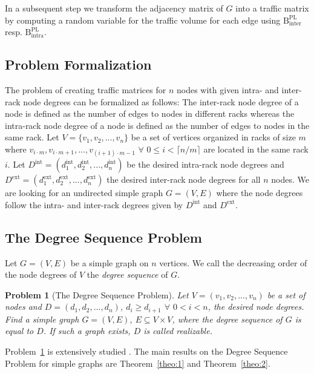 \documentclass[journal,10pt]{IEEEtran}
\newtheorem{problem}{Problem}
\newcommand{\bytes}[2]{\ensuremath{\mathrm{B}^{\mathrm{#1}}_{\mathrm{#2}}}}
\begin{document}
		In a subsequent step we transform the adjacency matrix of $G$ into a traffic matrix by computing a random variable for the traffic volume 
		for each edge using \bytes{PL}{inter} resp. \bytes{PL}{intra}.

		
	\subsection{Problem Formalization}
		The problem of creating traffic matrices for $n$ nodes with given intra- and inter-rack node degrees 
		can be formalized as follows:
		The inter-rack node degree of a node is defined as the number of edges to nodes in different racks
		whereas the intra-rack node degree of a node is defined as the number of edges to nodes in the same rack.
		Let $V = \lbrace v_1, v_2, ..., v_n \rbrace$ be a set of vertices organized in racks of size $m$ where
		$v_{i \cdot m}, v_{i \cdot m +1}, ..., v_{(i+1) \cdot m -1}$ 
		$\forall$ $0 \leq i < \lceil n/m \rceil$		
		are located in the same rack $i$.
		Let $D^{\mathrm{int}} = (d^{\mathrm{int}}_1, d^{\mathrm{int}}_2, ..., d^{\mathrm{int}}_n)$ be the desired intra-rack node degrees and
		$D^{\mathrm{ext}} = (d^{\mathrm{ext}}_1, d^{\mathrm{ext}}_2, ..., d^{\mathrm{ext}}_n)$ the desired inter-rack node degrees for all $n$ nodes.
		We are looking for an undirected simple graph $G = (V,E)$ where the node degrees follow the intra- and inter-rack 
		degrees given by $D^{\mathrm{int}}$ and $D^{\mathrm{ext}}$.
	\subsection{The Degree Sequence Problem}
		\label{sec:GraphsWithDegs}
		Let $G = (V,E)$ be a simple graph on $n$ vertices.
		We call the decreasing order of the node degrees of $V$ the \emph{degree sequence} of $G$.
		\begin{problem}[The Degree Sequence Problem]
		\label{prob:DegSeqProb}
		Let $V = (v_1, v_2, ...,v_n)$ be a set of nodes and $D = (d_1, d_2, ..., d_n)$, $d_i \geq d_{i+1}$ $\forall$ $0 < i < n$, the desired node degrees.
		Find a simple 
		graph
		$G = (V,E)$, $E \subseteq V \times V$, where the degree sequence of $G$ is equal to $D$.
		If such a graph exists, $D$ is called \emph{realizable}.
		\end{problem}
		
		Problem~\ref{prob:DegSeqProb} is extensively studied \cite{hakimi62, havel55}.
		The main results on the Degree Sequence Problem for simple graphs are Theorem~\ref{theo:1} and Theorem~\ref{theo:2}.
		
\end{document}
